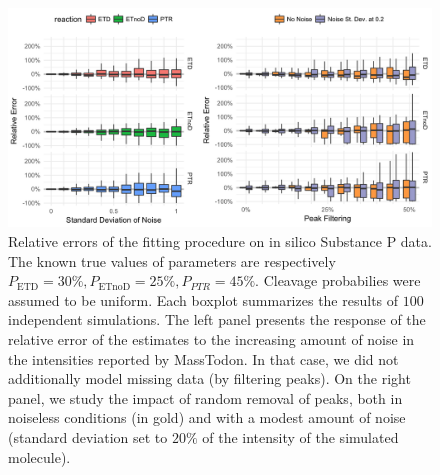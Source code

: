 \documentclass{llncs}
\begin{document}
        \begin{figure}[h]
                \center
                \includegraphics[width=.8\textwidth]{kokos.png}
                \caption{ Relative errors of the fitting procedure on in silico Substance P data. The known true values of parameters are respectively $P_\text{ETD}=30\%, P_\text{ETnoD}= 25\%, P_{PTR}= 45\%$. Cleavage probabilies were assumed to be uniform. Each boxplot summarizes the results of $100$ independent simulations. The left panel presents the response of the relative error of the estimates to the increasing amount of noise in the intensities reported by MassTodon. In that case, we did not additionally model missing data (by filtering peaks). On the right panel, we study the impact of random removal of peaks, both in noiseless conditions (in gold) and with a modest amount of noise (standard deviation set to $20\%$ of the intensity of the simulated molecule).
                }\label{fig::kokos}
        \end{figure}
\end{document}
